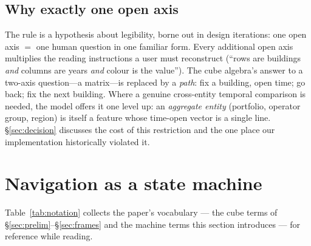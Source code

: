 \documentclass[11pt,a4paper]{article}
\theoremstyle{remark}
\begin{document}
\subsection{Why exactly one open axis}\label{sec:whyone}

The rule is a hypothesis about legibility, borne out in design iterations: one open
axis $=$ one human question in one familiar form. Every additional open axis
multiplies the reading instructions a user must reconstruct (``rows are buildings
\emph{and} columns are years \emph{and} colour is the value''). The cube algebra's
answer to a two-axis question---a matrix---is replaced by a \emph{path}: fix a
building, open time; go back; fix the next building. Where a genuine cross-entity
temporal comparison is needed, the model offers it one level up: an \emph{aggregate
entity} (portfolio, operator group, region) is itself a feature whose time-open
vector is a single line. \S\ref{sec:decision} discusses the cost of this
restriction and the one place our implementation historically violated it.

\section{Navigation as a state machine}\label{sec:machine}

Table~\ref{tab:notation} collects the paper's vocabulary --- the cube terms of
\S\ref{sec:prelim}--\S\ref{sec:frames} and the machine terms this section
introduces --- for reference while reading.
\end{document}

